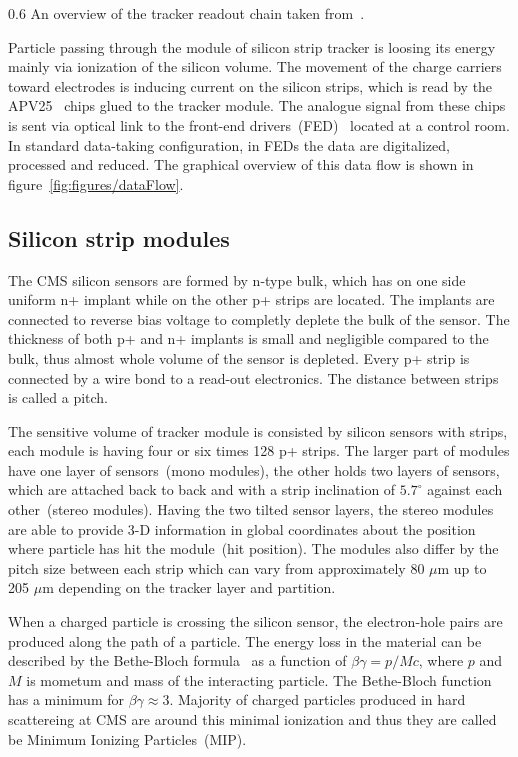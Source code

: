                  {0.6}       %
                 {An overview of the tracker readout chain taken from~\cite{Bainbridge:2004jc}.} %

Particle passing through the module of silicon strip tracker is loosing its energy mainly via ionization of the silicon volume. The movement of the charge carriers toward electrodes is inducing current on the silicon strips, which is read by the APV25~\cite{French:2001xb} chips glued to the tracker module. The analogue signal from these chips is sent via optical link to the front-end drivers~(FED)~\cite{Baird:2002wg} located at a control room. In standard data-taking configuration, in FEDs the data are digitalized, processed and reduced. The graphical overview of this data flow is shown in figure~\ref{fig:figures/dataFlow}.

\subsection{Silicon strip modules}

The CMS silicon sensors are formed by n-type bulk, which has on one side uniform n+ implant while on the other p+ strips are located. The implants are connected to reverse bias voltage to completly deplete the bulk of the sensor. The thickness of both p+ and n+ implants is small and negligible compared to the bulk, thus almost whole volume of the sensor is depleted. Every p+ strip is connected by a wire bond to a read-out electronics. The distance between strips is called a pitch.

The sensitive volume of tracker module is consisted by silicon sensors with strips, each module is having four or six times 128 p+ strips. The larger part of modules have one layer of sensors~(mono modules), the other holds two layers of sensors, which are attached back to back and with a strip inclination of $5.7^{\circ}$ against each other~(stereo modules). Having the two tilted sensor layers, the stereo modules are able to provide 3-D information in global coordinates about the position where particle has hit the module~(hit position). The modules also differ by the pitch size between each strip which can vary from approximately 80 $\mu$m up to 205 $\mu$m depending on the tracker layer and partition.

When a charged particle is crossing the silicon sensor, the electron-hole pairs are produced along the path of a particle. The energy loss in the material can be described by the Bethe-Bloch formula~\cite{Groom:2000sm} as a function of $\beta\gamma = p/Mc$, where $p$ and $M$ is mometum and mass of the interacting particle. The Bethe-Bloch function has a minimum for $\beta\gamma \approx 3$. Majority of charged particles produced in hard scattereing at CMS are around this minimal ionization and thus they are called be Minimum Ionizing Particles~(MIP).

